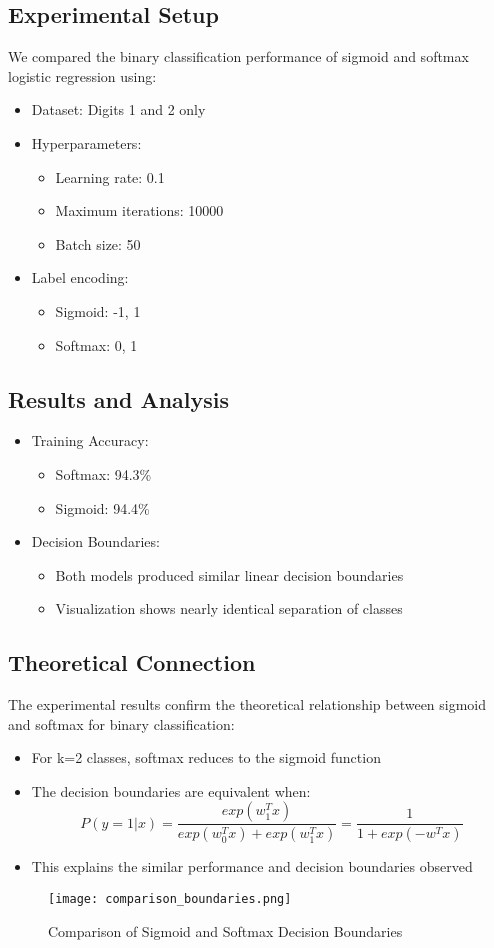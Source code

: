 \documentclass{article}
\begin{document}
\subsection*{Experimental Setup}
We compared the binary classification performance of sigmoid and softmax logistic regression using:
\begin{itemize}
    \item Dataset: Digits 1 and 2 only
    \item Hyperparameters:
    \begin{itemize}
        \item Learning rate: 0.1
        \item Maximum iterations: 10000
        \item Batch size: 50
    \end{itemize}
    \item Label encoding:
    \begin{itemize}
        \item Sigmoid: {-1, 1}
        \item Softmax: {0, 1}
    \end{itemize}
\end{itemize}

\subsection*{Results and Analysis}
\begin{itemize}
    \item Training Accuracy:
    \begin{itemize}
        \item Softmax: 94.3\%
        \item Sigmoid: 94.4\%
    \end{itemize}
    \item Decision Boundaries:
    \begin{itemize}
        \item Both models produced similar linear decision boundaries
        \item Visualization shows nearly identical separation of classes
    \end{itemize}
\end{itemize}

\subsection*{Theoretical Connection}
The experimental results confirm the theoretical relationship between sigmoid and softmax for binary classification:
\begin{itemize}
    \item For k=2 classes, softmax reduces to the sigmoid function
    \item The decision boundaries are equivalent when:
    \[P(y=1|x) = \frac{exp(w_1^Tx)}{exp(w_0^Tx) + exp(w_1^Tx)} = \frac{1}{1 + exp(-w^Tx)}\]
    \item This explains the similar performance and decision boundaries observed
\end{itemize}

\begin{figure}[h]
    \centering
    \texttt{[image: comparison\_boundaries.png]}
    \caption{Comparison of Sigmoid and Softmax Decision Boundaries}
    \label{fig:comparison}
\end{figure}
\end{document}

